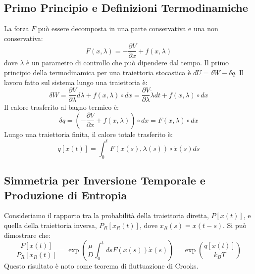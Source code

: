 \subsection{Primo Principio e Definizioni Termodinamiche}
La forza $F$ può essere decomposta in una parte conservativa e una non conservativa:
\begin{equation}
 F(x, \lambda) = -\frac{\partial V}{\partial x} + f(x, \lambda)
\end{equation}
dove $\lambda$ è un parametro di controllo che può dipendere dal tempo.
Il primo principio della termodinamica per una traiettoria stocastica è $dU = \delta W - \delta q$.
Il lavoro fatto sul sistema lungo una traiettoria è:
\begin{equation}
 \delta W = \frac{\partial V}{\partial \lambda} d\lambda + f(x,\lambda) \circ dx = \frac{\partial V}{\partial \lambda} \dot{\lambda} dt + f(x,\lambda) \circ dx
\end{equation}
Il calore trasferito al bagno termico è:
\begin{equation}
 \delta q = (-\frac{\partial V}{\partial x} + f(x,\lambda)) \circ dx = F(x,\lambda) \circ dx
\end{equation}
Lungo una traiettoria finita, il calore totale trasferito è:
\begin{equation}
 q[x(t)] = \int_0^t F(x(s),\lambda(s)) \circ \dot{x}(s) ds
\end{equation}

\subsection{Simmetria per Inversione Temporale e Produzione di Entropia}
Consideriamo il rapporto tra la probabilità della traiettoria diretta, $P[x(t)]$, e quella della traiettoria inversa, $P_R[x_R(t)]$, dove $x_R(s) = x(t-s)$. Si può dimostrare che:
\begin{equation}
 \frac{P[x(t)]}{P_R[x_R(t)]} = \exp \left( \frac{\mu}{D} \int_0^t ds F(x(s)) \dot{x}(s) \right) = \exp \left( \frac{q[x(t)]}{k_B T} \right)
\end{equation}
Questo risultato è noto come teorema di fluttuazione di Crooks.

